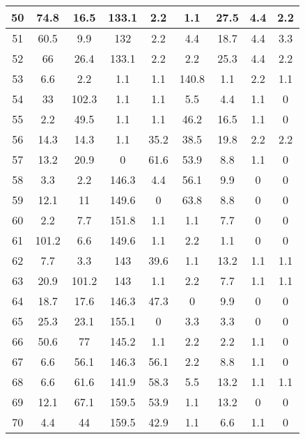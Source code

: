 \begin{table}[h!]
\begin{tabular}{|c|c|c|c|c|c|c|c|c|}
50           & 74.8  & 16.5  & 133.1 & 2.2   & 1.1   & 27.5 & 4.4   & 2.2   \\ \hline
51           & 60.5  & 9.9   & 132   & 2.2   & 4.4   & 18.7 & 4.4   & 3.3   \\ \hline
52           & 66    & 26.4  & 133.1 & 2.2   & 2.2   & 25.3 & 4.4   & 2.2   \\ \hline
53           & 6.6   & 2.2   & 1.1   & 1.1   & 140.8 & 1.1  & 2.2   & 1.1   \\ \hline
54           & 33    & 102.3 & 1.1   & 1.1   & 5.5   & 4.4  & 1.1   & 0     \\ \hline
55           & 2.2   & 49.5  & 1.1   & 1.1   & 46.2  & 16.5 & 1.1   & 0     \\ \hline
56           & 14.3  & 14.3  & 1.1   & 35.2  & 38.5  & 19.8 & 2.2   & 2.2   \\ \hline
57           & 13.2  & 20.9  & 0     & 61.6  & 53.9  & 8.8  & 1.1   & 0     \\ \hline
58           & 3.3   & 2.2   & 146.3 & 4.4   & 56.1  & 9.9  & 0     & 0     \\ \hline
59           & 12.1  & 11    & 149.6 & 0     & 63.8  & 8.8  & 0     & 0     \\ \hline
60           & 2.2   & 7.7   & 151.8 & 1.1   & 1.1   & 7.7  & 0     & 0     \\ \hline
61           & 101.2 & 6.6   & 149.6 & 1.1   & 2.2   & 1.1  & 0     & 0     \\ \hline
62           & 7.7   & 3.3   & 143   & 39.6  & 1.1   & 13.2 & 1.1   & 1.1   \\ \hline
63           & 20.9  & 101.2 & 143   & 1.1   & 2.2   & 7.7  & 1.1   & 1.1   \\ \hline
64           & 18.7  & 17.6  & 146.3 & 47.3  & 0     & 9.9  & 0     & 0     \\ \hline
65           & 25.3  & 23.1  & 155.1 & 0     & 3.3   & 3.3  & 0     & 0     \\ \hline
66           & 50.6  & 77    & 145.2 & 1.1   & 2.2   & 2.2  & 1.1   & 0     \\ \hline
67           & 6.6   & 56.1  & 146.3 & 56.1  & 2.2   & 8.8  & 1.1   & 0     \\ \hline
68           & 6.6   & 61.6  & 141.9 & 58.3  & 5.5   & 13.2 & 1.1   & 1.1   \\ \hline
69           & 12.1  & 67.1  & 159.5 & 53.9  & 1.1   & 13.2 & 0     & 0     \\ \hline
70           & 4.4   & 44    & 159.5 & 42.9  & 1.1   & 6.6  & 1.1   & 0     \\ \hline
\end{tabular}
\end{table}
